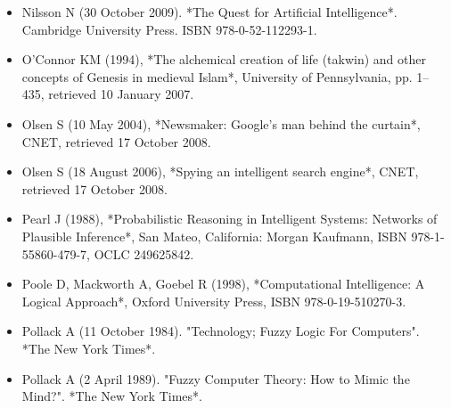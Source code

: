 \begin{itemize}
\item Nilsson N (30 October 2009). *The Quest for Artificial Intelligence*. Cambridge University Press. ISBN 978-0-52-112293-1.
\item O'Connor KM (1994), *The alchemical creation of life (takwin) and other concepts of Genesis in medieval Islam*, University of Pennsylvania, pp. 1–435, retrieved 10 January 2007.  
\item Olsen S (10 May 2004), *Newsmaker: Google's man behind the curtain*, CNET, retrieved 17 October 2008.  
\item Olsen S (18 August 2006), *Spying an intelligent search engine*, CNET, retrieved 17 October 2008.  
\item Pearl J (1988), *Probabilistic Reasoning in Intelligent Systems: Networks of Plausible Inference*, San Mateo, California: Morgan Kaufmann, ISBN 978-1-55860-479-7, OCLC 249625842.  
\item Poole D, Mackworth A, Goebel R (1998), *Computational Intelligence: A Logical Approach*, Oxford University Press, ISBN 978-0-19-510270-3.  
\item Pollack A (11 October 1984). "Technology; Fuzzy Logic For Computers". *The New York Times*.  
\item Pollack A (2 April 1989). "Fuzzy Computer Theory: How to Mimic the Mind?". *The New York Times*.
\end{itemize}